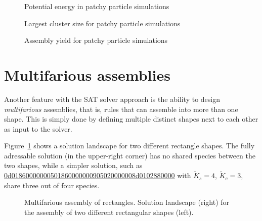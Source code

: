 \begin{figure}[h]
    \centering
    \caption{Potential energy in patchy particle simulations}
\end{figure}

\begin{figure}[h]
    \centering
    \caption{Largest cluster size for patchy particle simulations}
\end{figure}

\begin{figure}[h]
    \centering
    \caption{Assembly yield for patchy particle simulations}
\end{figure}

\section{Multifarious assemblies}

Another feature with the SAT solver approach is the ability to design \emph{multifarious} assemblies, that is, rules that can assemble into more than one shape. This is simply done by defining multiple distinct shapes next to each other as input to the solver.

Figure~\ref{fig:multifarious_rectangles} shows a solution landscape for two different rectangle shapes. The fully adressable solution (in the upper-right corner) has no shared species between the two shapes, while a simpler solution, such as \href{https://akodiat.github.io/polycubes/?assemblyMode=stochastic&rule=0d01860000000501860000000905020000008d0102880000}{0d01860000000501860000000905020000008d0102880000} with \(\widetilde{K}_s=4\), \(\widetilde{K}_c=3\), share three out of four species.

\begin{figure}[h]
    \centering
    \caption{Multifarious assembly of rectangles. Solution landscape (right) for the assembly of two different rectangular shapes (left).}
    \label{fig:multifarious_rectangles}
\end{figure}